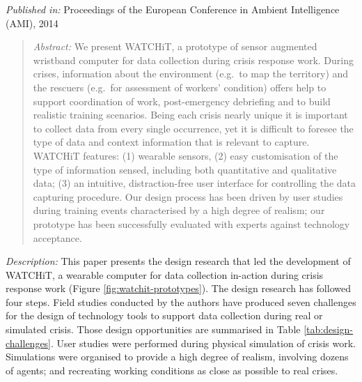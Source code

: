 \emph{Published in:} Proceedings of the European Conference in Ambient Intelligence (AMI), 2014 

\begin{quote}
\emph{Abstract:} We present WATCHiT, a prototype of sensor augmented wristband computer for data collection during crisis response work. During crises, information about the environment (e.g.~to map the territory) and the rescuers (e.g.~for assessment of workers' condition) offers help to support coordination of work, post-emergency debriefing and to build realistic training scenarios. Being each crisis nearly unique it is important to collect data from every single occurrence, yet it is difficult to foresee the type of data and context information that is relevant to capture. WATCHiT features: (1) wearable sensors, (2) easy customisation of the type of information sensed, including both quantitative and qualitative data; (3) an intuitive, distraction-free user interface for controlling the data capturing procedure. Our design process has been driven by user studies during training events characterised by a high degree of realism; our prototype has been successfully evaluated with experts against technology acceptance. 
\end{quote}

\emph{Description:} This paper presents the design research that led the development of WATCHiT, a wearable computer for data collection in-action during crisis response work (Figure \ref{fig:watchit-prototypes}). The design research has followed four steps. Field studies conducted by the authors have produced seven challenges for the design of technology tools to support data collection during real or simulated crisis. Those design opportunities are summarised in Table \ref{tab:design-challenges}. User studies were performed during physical simulation of crisis work. Simulations were organised to provide a high degree of realism, involving dozens of agents; and recreating working conditions as close as possible to real crises.

